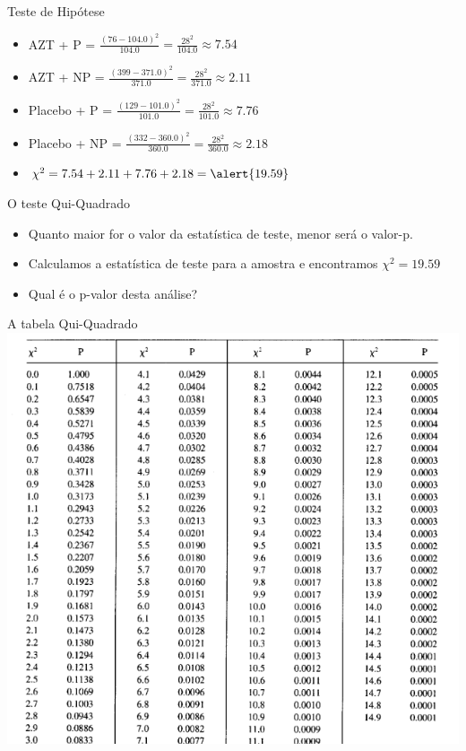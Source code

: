 \documentclass{beamer}
\begin{document}
\begin{frame}{Teste de Hipótese}
  \begin{example}
    \begin{itemize}
    \item AZT + P = $\frac{(76 - 104.0)^2}{104.0} = \frac{28^2}{104.0}
      \approx 7.54$
    \item AZT + NP = $\frac{(399 - 371.0)^2}{371.0} =
      \frac{28^2}{371.0} \approx 2.11$
    \item Placebo + P = $\frac{(129 - 101.0)^2}{101.0} =
      \frac{28^2}{101.0} \approx 7.76$
    \item Placebo + NP = $\frac{(332 - 360.0)^2}{360.0} =
      \frac{28^2}{360.0} \approx 2.18$
    \item $\chi^2 = 7.54 + 2.11 + 7.76 + 2.18 = \alert{19.59}$
    \end{itemize}
  \end{example}
\end{frame}

\begin{frame}{O teste Qui-Quadrado}
  \begin{itemize}
  \item Quanto \alert{maior} for o valor da estatística de teste,
    \alert{menor} será o valor-p.
  \item Calculamos a estatística de teste para a amostra e encontramos
    $\chi^2 = 19.59$
  \item Qual é o p-valor desta análise?
  \end{itemize}
\end{frame}

\begin{frame}{A tabela Qui-Quadrado}
\includegraphics[height=\textheight]{TC/qui-quadrado1}
\end{frame}
\end{document}
